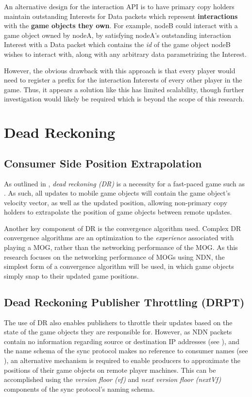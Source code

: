 An alternative design for the interaction API is to have primary copy holders maintain outstanding Interests for Data packets which represent \textbf{interactions} with the \textbf{game objects they own}. For example, nodeB could interact with a game object owned by nodeA, by satisfying nodeA's outstanding interaction Interest with a Data packet which contains the \textit{id} of the game object nodeB wishes to interact with, along with any arbitrary data parametrizing the Interest. 

However, the obvious drawback with this approach is that every player would need to register a prefix for the interaction Interests of every other player in the game. Thus, it appears a solution like this has limited scalability, though further investigation would likely be required which is beyond the scope of this research. 



\section{Dead Reckoning}\label{sec:des:dr}
\subsection{Consumer Side Position Extrapolation}
As outlined in , \textit{dead reckoning (DR)} is a necessity for a fast-paced game such as \game{}. As such, all updates to mobile game objects will contain the game object's velocity vector, as well as the updated position, allowing non-primary copy holders to extrapolate the position of game objects between remote updates.

Another key component of DR is the convergence algorithm used. Complex DR convergence algorithms are an optimization to the \textit{experience} associated with playing a MOG, rather than the networking performance of the MOG. As this research focuses on the networking performance of MOGs using NDN, the simplest form of a convergence algorithm will be used, in which game objects simply snap to their updated game positions.

\subsection{Dead Reckoning Publisher Throttling (DRPT)}
The use of DR also enables publishers to throttle their updates based on the state of the game objects they are responsible for. However, as NDN packets contain no information regarding source or destination IP addresses (see ), and the name schema of the sync protocol makes no reference to consumer names (see ), an alternative mechanism is required to enable producers to approximate the positions of their game objects on remote player machines. This can be accomplished using the \textit{version floor (vf)} and \textit{next version floor (nextVf)} components of the sync protocol's naming schema.

